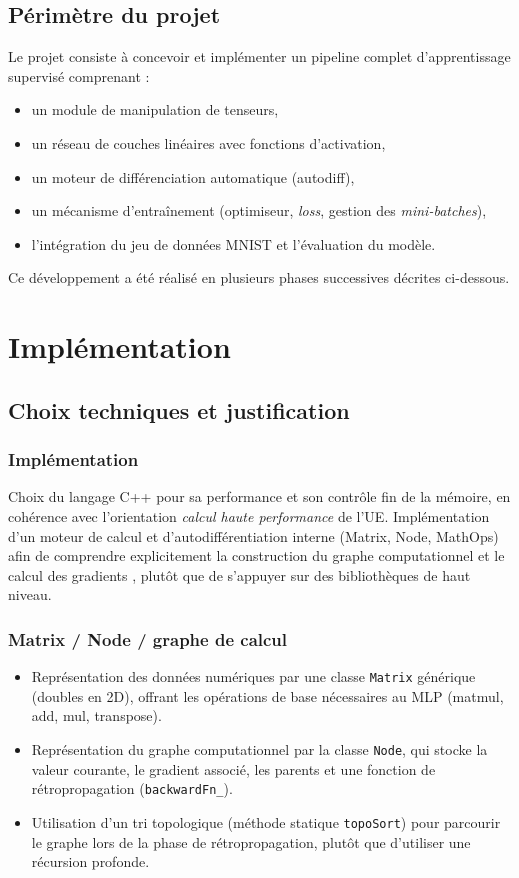 \documentclass[a4paper,11pt]{article}
\begin{document}
\subsection{Périmètre du projet}
Le projet consiste à concevoir et implémenter un pipeline complet d'apprentissage supervisé comprenant :
\begin{itemize}
  \item un module de manipulation de tenseurs,
  \item un réseau de couches linéaires avec fonctions d'activation,
  \item un moteur de différenciation automatique (autodiff),
  \item un mécanisme d'entraînement (optimiseur, \textit{loss}, gestion des \textit{mini-batches}),
  \item l'intégration du jeu de données MNIST et l'évaluation du modèle.
\end{itemize}
Ce développement a été réalisé en plusieurs phases successives décrites ci-dessous.

\clearpage

\section{Implémentation}
\subsection{Choix techniques et justification}
\subsubsection{Implémentation}
Choix du langage C++ pour sa performance et son contrôle fin de la mémoire, en cohérence avec l'orientation \emph{calcul haute performance} de l'UE. Implémentation d'un moteur de calcul et d'autodifférentiation interne (Matrix, Node, MathOps) afin de comprendre explicitement la construction du graphe computationnel et le calcul des gradients \cite{goodfellow2016}, plutôt que de s'appuyer sur des bibliothèques de haut niveau.

\subsubsection{Matrix / Node / graphe de calcul}
\begin{itemize}
  \item Représentation des données numériques par une classe \texttt{Matrix} générique (doubles en 2D), offrant les opérations de base nécessaires au MLP (matmul, add, mul, transpose).
  \item Représentation du graphe computationnel par la classe \texttt{Node}, qui stocke la valeur courante, le gradient associé, les parents et une fonction de rétropropagation (\texttt{backwardFn\_}).
  \item Utilisation d'un tri topologique (méthode statique \texttt{topoSort}) pour parcourir le graphe lors de la phase de rétropropagation, plutôt que d'utiliser une récursion profonde.
\end{itemize}
\end{document}
